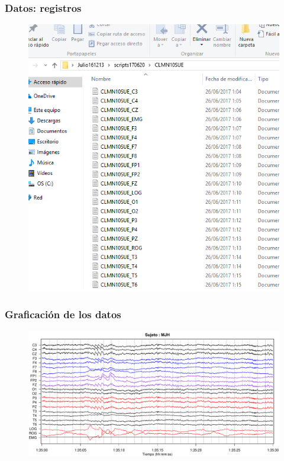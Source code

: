 \documentclass[11pt]{beamer}
\begin{document}

\begin{frame}\frametitle{Datos: registros}
\begin{figure}
\centering
\includegraphics[width=0.7\linewidth]{./curso_scripts/archivos.png}
\end{figure}
\end{frame}


\begin{frame}\frametitle{Graficación de los datos}
\begin{figure}
\centering
\includegraphics[width=\linewidth]{./img_ejemplos/MJH_190_PDG_lucirse_PSG.pdf}
\end{figure}
\end{frame}

\end{document}
